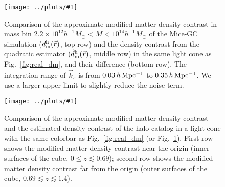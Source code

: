 \documentclass[prd,amsmath,amssymb,floatfix,superscriptaddress,nofootinbib,twocolumn]{revtex4-1}
\newcommand{\vrr}{\vec{r}}
\newcommand{\vk}{\vec{k}}
\newcommand{\rf}[1]{\ref{fig:#1}}
\newcommand{\sfig}[2]{
\texttt{[image: ../plots/\#1]}
        }
\newcommand{\Sfig}[2]{
   \begin{figure}[thbp]
   \begin{center}
    \sfig{../plots/#1.pdf}{\columnwidth}
    \caption{{\small #2}}
    \label{fig:#1}
     \end{center}
   \end{figure}
}
\begin{document}
\Sfig{real_halo}{Comparison of the approximate modified matter density contrast in mass bin $2.2 \times 10^{12}h^{-1}M_{\odot}<M < 10^{14}h^{-1}M_{\odot}$ of the Mice-GC simulation ($d^{\rm h}_{\rm m}(\vrr)$, top row) and the density contrast from the quadratic estimator ($\hat{d}^{\rm h}_{\rm m}(\vrr)$, middle row) in the same light cone as Fig.~\rf{real_dm}, and their difference (bottom row). The integration range of $\vk_{s}$ is from $0.03\, h \rm \, Mpc^{-1}$ to $0.35\, h \rm \, Mpc^{-1}$. We use a larger upper limit to slightly reduce the noise term.} 
\Sfig{cube_halo}{Comparison of the approximate modified matter density contrast and the estimated density contrast of the halo catalog in a light cone with the same colorbar as Fig.~\rf{real_dm} (or Fig.~\rf{real_halo}). First row shows the modified matter density contrast near the origin (inner surfaces of the cube, $0\leqslant z \lesssim 0.69$); second row shows the modified matter density contrast far from the origin (outer surfaces of the cube, $0.69\lesssim z \lesssim 1.4$).}
\end{document}
